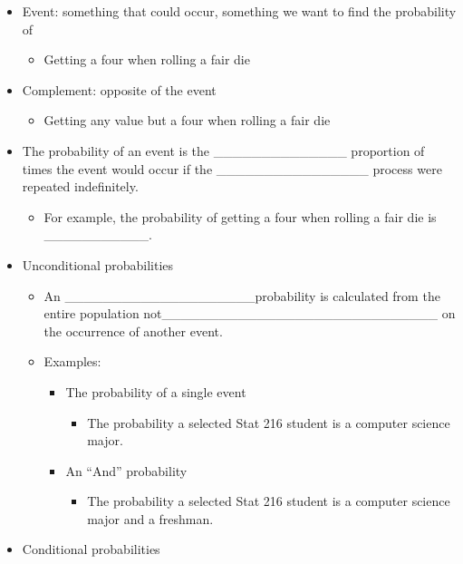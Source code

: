 \documentclass[
]{report}
\providecommand{\tightlist}{%
  \setlength{\itemsep}{0pt}\setlength{\parskip}{0pt}}
\begin{document}
\begin{itemize}
\item
  Event: something that could occur, something we want to find the probability of

  \begin{itemize}
  \tightlist
  \item
    Getting a four when rolling a fair die
  \end{itemize}
\item
  Complement: opposite of the event

  \begin{itemize}
  \tightlist
  \item
    Getting any value but a four when rolling a fair die
  \end{itemize}
\item
  The probability of an event is the \_\_\_\_\_\_\_\_\_\_\_\_\_\_ proportion of times the event would occur if the \_\_\_\_\_\_\_\_\_\_\_\_\_\_\_\_ process were repeated indefinitely.

  \begin{itemize}
  \tightlist
  \item
    For example, the probability of getting a four when rolling a fair die is \_\_\_\_\_\_\_\_\_\_\_.
  \end{itemize}
\item
  Unconditional probabilities

  \begin{itemize}
  \item
    An \_\_\_\_\_\_\_\_\_\_\_\_\_\_\_\_\_\_\_\_probability is calculated from the entire population not\_\_\_\_\_\_\_\_\_\_\_\_\_\_\_\_\_\_\_\_\_\_\_\_\_\_\_\_\_
    on the occurrence of another event.
  \item
    Examples:

    \begin{itemize}
    \item
      The probability of a single event

      \begin{itemize}
      \tightlist
      \item
        The probability a selected Stat 216 student is a computer science major.
      \end{itemize}
    \item
      An ``And'' probability

      \begin{itemize}
      \tightlist
      \item
        The probability a selected Stat 216 student is a computer science major and a freshman.
      \end{itemize}
    \end{itemize}
  \end{itemize}
\item
  Conditional probabilities


\end{itemize}
\end{document}
